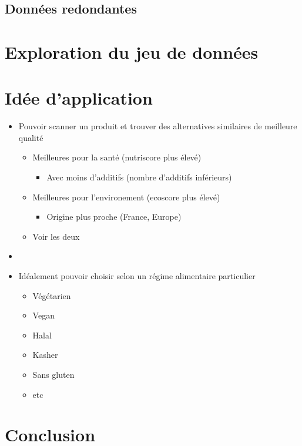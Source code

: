   \subsection{Données redondantes}
    \begin{frame}{\insertsubsection}
      
    \end{frame}

\section{Exploration du jeu de données}

\section{Idée d'application}
\begin{frame}
  \begin{itemize}
    \item Pouvoir scanner un produit et trouver des alternatives similaires de meilleure qualité
    \begin{itemize}
      \item Meilleures pour la santé (nutriscore plus élevé)
      \begin{itemize}
        \item Avec moins d'additifs (nombre d'additifs inférieurs)
      \end{itemize}
      \item Meilleures pour l'environement (ecoscore plus élevé)
      \begin{itemize}
        \item Origine plus proche (France, Europe)
      \end{itemize}
      \item Voir les deux
      
    \end{itemize}
    \item[]
    \item Idéalement pouvoir choisir selon un régime alimentaire particulier
    \begin{itemize}
      \item Végétarien
      \item Vegan
      \item Halal
      \item Kasher
      \item Sans gluten
      \item etc
    \end{itemize}
  \end{itemize}
\end{frame}

\section{Conclusion}

